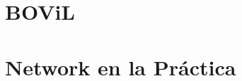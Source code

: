 \documentclass[11pt, oneside]{book} %
\begin{document}
\begin{appendix}
\chapter{BOViL} \label{chap:c6_bovil}


\chapter{Network en la Pr\'actica} \label{chap:c6_network}

\end{appendix}

\listoffigures{}

\end{document}

